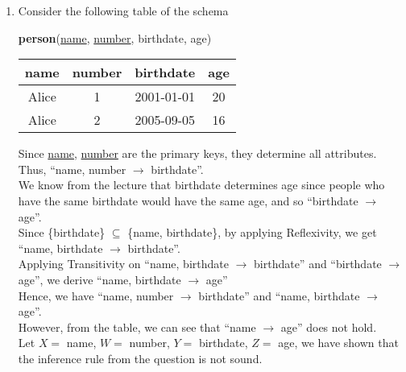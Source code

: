\documentclass[12pt]{article}
\begin{document}
\begin{enumerate}
  \item Consider the following table of the schema
        \begin{center}
          \textbf{person}(\underline{name}, \underline{number}, birthdate, age)
        \end{center}
        \begin{center}
          \begin{tabular}{ | c | c | c | c | }
            \hline
            \textbf{name} & \textbf{number} & \textbf{birthdate} & \textbf{age} \\
            \hline
            Alice         & 1               & 2001-01-01        & 20 \\
            Alice         & 2               & 2005-09-05        & 16 \\
            \hline
          \end{tabular}
        \end{center}
        Since \underline{name}, \underline{number} are the primary keys, they       
        determine all attributes. Thus, ``name, number $\longrightarrow$
        birthdate''. \\
        We know from the lecture that birthdate determines age since people who
        have the same birthdate would have the same age, and so ``birthdate
        $\longrightarrow$ age''. \\
        Since \{birthdate\} $\subseteq$ \{name, birthdate\}, by applying
        Reflexivity, we get ``name, birthdate $\longrightarrow$ birthdate''. \\
        Applying Transitivity on ``name, birthdate $\longrightarrow$ birthdate''
        and ``birthdate $\longrightarrow$ age'', we derive ``name, birthdate
        $\longrightarrow$ age'' \\
        Hence, we have ``name, number $\longrightarrow$ birthdate'' and ``name,
        birthdate $\longrightarrow$ age''. \\
        However, from the table, we can see that ``name $\longrightarrow$ age''
        does not hold. \\
        Let $X =$ name, $W =$ number, $Y =$ birthdate, $Z =$ age, we have shown
        that the inference rule from the question is not sound.
  \ \\


\end{enumerate}
\end{document}
